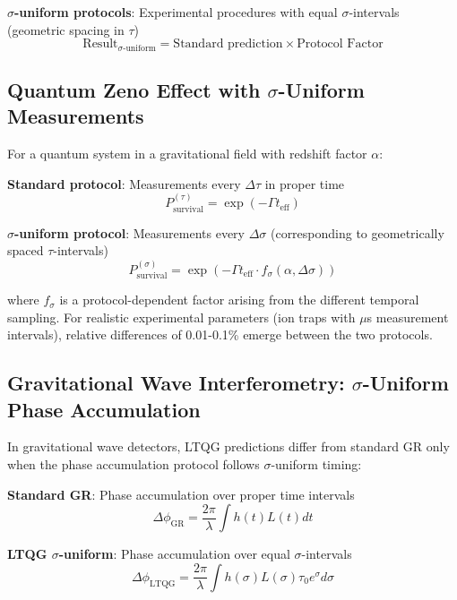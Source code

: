 \documentclass[12pt,a4paper]{article}
\begin{document}
\textbf{$\sigma$-uniform protocols}: Experimental procedures with equal $\sigma$-intervals (geometric spacing in $\tau$)
\begin{equation}
\text{Result}_{\sigma\text{-uniform}} = \text{Standard prediction} \times \text{Protocol Factor}
\end{equation}

\subsection{Quantum Zeno Effect with $\sigma$-Uniform Measurements}

For a quantum system in a gravitational field with redshift factor $\alpha$:

\textbf{Standard protocol}: Measurements every $\Delta \tau$ in proper time
\begin{equation}
P_{\text{survival}}^{(\tau)} = \exp\left(-\Gamma t_{\text{eff}}\right)
\end{equation}

\textbf{$\sigma$-uniform protocol}: Measurements every $\Delta \sigma$ (corresponding to geometrically spaced $\tau$-intervals)
\begin{equation}
P_{\text{survival}}^{(\sigma)} = \exp\left(-\Gamma t_{\text{eff}} \cdot f_{\sigma}(\alpha, \Delta\sigma)\right)
\end{equation}

where $f_{\sigma}$ is a protocol-dependent factor arising from the different temporal sampling. For realistic experimental parameters (ion traps with $\mu$s measurement intervals), relative differences of 0.01-0.1\% emerge between the two protocols.

\subsection{Gravitational Wave Interferometry: $\sigma$-Uniform Phase Accumulation}

In gravitational wave detectors, LTQG predictions differ from standard GR only when the phase accumulation protocol follows $\sigma$-uniform timing:

\textbf{Standard GR}: Phase accumulation over proper time intervals
\begin{equation}
\Delta \phi_{\text{GR}} = \frac{2\pi}{\lambda} \int h(t) L(t) dt
\end{equation}

\textbf{LTQG $\sigma$-uniform}: Phase accumulation over equal $\sigma$-intervals  
\begin{equation}
\Delta \phi_{\text{LTQG}} = \frac{2\pi}{\lambda} \int h(\sigma) L(\sigma) \tau_0 e^{\sigma} d\sigma
\end{equation}
\end{document}
